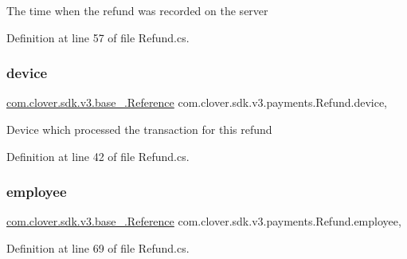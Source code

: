 The time when the refund was recorded on the server 



Definition at line 57 of file Refund.\+cs.

\mbox{\label{classcom_1_1clover_1_1sdk_1_1v3_1_1payments_1_1_refund_a7352818ebf5686c54a44d083f2599c71}} 
\subsubsection{\texorpdfstring{device}{device}}
{\footnotesize\ttfamily \hyperlink{classcom_1_1clover_1_1sdk_1_1v3_1_1base___1_1_reference}{com.\+clover.\+sdk.\+v3.\+base\+\_\+.\+Reference} com.\+clover.\+sdk.\+v3.\+payments.\+Refund.\+device\hspace{0.3cm}{\ttfamily [get]}, {\ttfamily [set]}}



Device which processed the transaction for this refund 



Definition at line 42 of file Refund.\+cs.

\mbox{\label{classcom_1_1clover_1_1sdk_1_1v3_1_1payments_1_1_refund_aabe33b851988730312b3f9468c1817f8}} 
\subsubsection{\texorpdfstring{employee}{employee}}
{\footnotesize\ttfamily \hyperlink{classcom_1_1clover_1_1sdk_1_1v3_1_1base___1_1_reference}{com.\+clover.\+sdk.\+v3.\+base\+\_\+.\+Reference} com.\+clover.\+sdk.\+v3.\+payments.\+Refund.\+employee\hspace{0.3cm}{\ttfamily [get]}, {\ttfamily [set]}}



Definition at line 69 of file Refund.\+cs.

